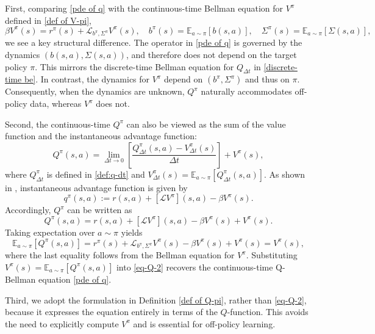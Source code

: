 \documentclass[12pt]{article}
\def\E{\mathbb E}
\def\nb{\nabla}
\begin{document}
First, comparing \eqref{pde of q} with the continuous-time Bellman equation for $V^\pi$ defined in \eqref{def of V-pi},
\[
\beta V^\pi(s) = r^\pi(s) + \mathcal{L}_{b^\pi,\Sigma^\pi} V^\pi(s), 
\quad b^\pi(s) = \E_{a\sim\pi}[b(s,a)], 
\quad \Sigma^\pi(s) = \E_{a\sim\pi}[\Sigma(s,a)],
\]
we see a key structural difference. The operator in \eqref{pde of q} is governed by the dynamics $(b(s,a), \Sigma(s,a))$, and therefore does not depend on the target policy $\pi$. This mirrors the discrete-time Bellman equation for $Q_{\Delta t}$ in \eqref{discrete-time be}. In contrast, the dynamics for $V^\pi$ depend on $(b^\pi, \Sigma^\pi)$ and thus on $\pi$. Consequently, when the dynamics are unknown, $Q^\pi$ naturally accommodates off-policy data, whereas $V^\pi$ does not.

Second, the continuous-time $Q^\pi$ can also be viewed as the sum of the value function and the instantaneous advantage function:
\[
Q^\pi(s,a) = \lim_{\Delta t\to 0} \left[\frac{Q^\pi_{\Delta t}(s,a) - V^\pi_{\Delta t}(s)}{\Delta t}\right] + V^\pi(s),
\]
where $Q^\pi_{\Delta t}$ is defined in \eqref{def:q-dt} and $V^\pi_{\Delta t}(s) = \E_{a\sim\pi}[Q^\pi_{\Delta t}(s,a)]$. As shown in \citep{jia2023q}, instantaneous advantage function is given by
\begin{equation}\label{def of q}
q^\pi(s,a) := r(s,a) + [\mathcal{L} V^\pi](s,a) - \beta V^\pi(s).
\end{equation}
Accordingly, $Q^\pi$ can be written as
\begin{equation}\label{eq-Q-2}
Q^\pi(s,a) = r(s,a) + [\mathcal{L} V^\pi](s,a) - \beta V^\pi(s) + V^\pi(s).
\end{equation}
Taking expectation over $a \sim \pi$ yields
\[
\E_{a\sim\pi}[Q^\pi(s,a)] 
= r^\pi(s) + \mathcal{L}_{b^\pi,\Sigma^\pi} V^\pi(s) - \beta V^\pi(s) + V^\pi(s)
= V^\pi(s),
\]
where the last equality follows from the Bellman equation for $V^\pi$. Substituting $V^\pi(s) = \E_{a\sim\pi}[Q^\pi(s,a)]$ into \eqref{eq-Q-2} recovers the continuous-time Q-Bellman equation \eqref{pde of q}.


Third, we adopt the formulation in Definition \ref{def of Q-pi}, rather than \eqref{eq-Q-2}, because it expresses the equation entirely in terms of the $Q$-function. This avoids the need to explicitly compute $V^\pi$ and is essential for  off-policy learning.

\end{document}
